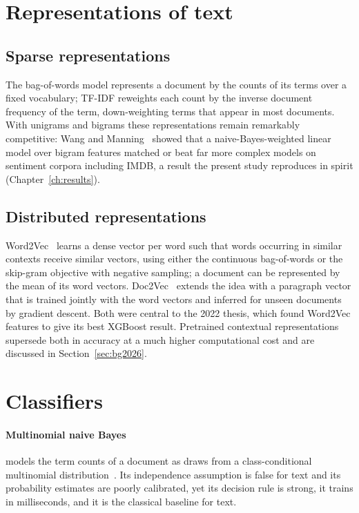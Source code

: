 \section{Representations of text}
\subsection{Sparse representations}
The bag-of-words model represents a document by the counts of its terms over a fixed vocabulary; TF-IDF reweights each count by the inverse document frequency of the term, down-weighting terms that appear in most documents. With unigrams and bigrams these representations remain remarkably competitive: Wang and Manning~\cite{wang2012} showed that a naive-Bayes-weighted linear model over bigram features matched or beat far more complex models on sentiment corpora including IMDB, a result the present study reproduces in spirit (Chapter~\ref{ch:results}).

\subsection{Distributed representations}
Word2Vec~\cite{mikolov2013} learns a dense vector per word such that words occurring in similar contexts receive similar vectors, using either the continuous bag-of-words or the skip-gram objective with negative sampling; a document can be represented by the mean of its word vectors. Doc2Vec~\cite{le2014} extends the idea with a paragraph vector that is trained jointly with the word vectors and inferred for unseen documents by gradient descent. Both were central to the 2022 thesis, which found Word2Vec features to give its best XGBoost result. Pretrained contextual representations~\cite{devlin2019} supersede both in accuracy at a much higher computational cost and are discussed in Section~\ref{sec:bg2026}.

\section{Classifiers}
\paragraph{Multinomial naive Bayes} models the term counts of a document as draws from a class-conditional multinomial distribution~\cite{mccallum1998}. Its independence assumption is false for text and its probability estimates are poorly calibrated, yet its decision rule is strong, it trains in milliseconds, and it is the classical baseline for text.


